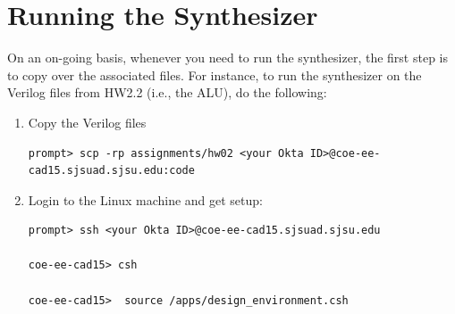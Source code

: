 \documentclass[11pt]{article}
\begin{document}
\section{Running the Synthesizer}
On an on-going basis, whenever you need to run the synthesizer, the first step is to copy over the associated files.  For instance, to run the synthesizer
on the Verilog files from HW2.2 (i.e., the ALU), do the following:

\begin{enumerate}
\item Copy the Verilog files
\begin{small}
\begin{verbatim}
prompt> scp -rp assignments/hw02 <your Okta ID>@coe-ee-cad15.sjsuad.sjsu.edu:code
\end{verbatim}
\end{small}
\item Login to the Linux machine and get setup:
\begin{small}
\begin{verbatim}
prompt> ssh <your Okta ID>@coe-ee-cad15.sjsuad.sjsu.edu

coe-ee-cad15> csh

coe-ee-cad15>  source /apps/design_environment.csh


\end{verbatim}
\end{small}
\end{enumerate}
\end{document}
